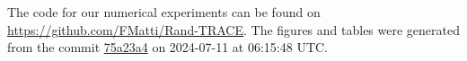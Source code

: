 The code for our numerical experiments can be found on \url{https://github.com/FMatti/Rand-TRACE}. The figures and tables were generated from the commit \href{https://github.com/FMatti/Rand-TRACE/tree/75a23a4}{75a23a4} on 2024-07-11 at 06:15:48 UTC.
